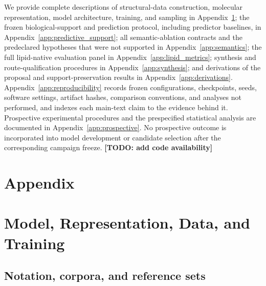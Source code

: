 \documentclass{article}
\newcommand{\TODO}[1]{\textbf{[TODO: #1]}}
\begin{document}
We provide complete descriptions of structural-data construction, molecular representation, model
architecture, training, and sampling in Appendix~\ref{app:architecture}; the frozen biological-support
and prediction protocol, including predictor baselines, in Appendix~\ref{app:predictive_support}; all
semantic-ablation contracts and the predeclared hypotheses that were not supported in
Appendix~\ref{app:semantics}; the full lipid-native evaluation panel in
Appendix~\ref{app:lipid_metrics}; synthesis and route-qualification procedures in
Appendix~\ref{app:synthesis}; and derivations of the proposal and support-preservation results in
Appendix~\ref{app:derivations}. Appendix~\ref{app:reproducibility} records frozen configurations,
checkpoints, seeds, software settings, artifact hashes, comparison conventions, and analyses not
performed, and indexes each main-text claim to the evidence behind it. Prospective experimental
procedures and the prespecified statistical analysis are documented in Appendix~\ref{app:prospective}.
No prospective outcome is incorporated into model development or candidate selection after the
corresponding campaign freeze.
\TODO{add code availability}





\appendix

\appendix

\section*{Appendix}


\section{Model, Representation, Data, and Training}
\label{app:architecture}

\subsection{Notation, corpora, and reference sets}
\label{app:corpora}
\end{document}
